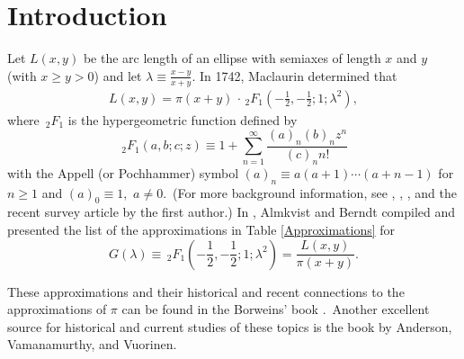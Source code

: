 \documentclass[final,oneeqnum]{siamltex}
\begin{document}
\section{Introduction}
\noindent Let $L(x,y)$ be the arc length of an ellipse with
\label{`semiaxes'} semiaxes of  length $x$ and $y$ (with $x \geq  y > 0$)
and let $\displaystyle  \lambda \equiv \frac{x-y}{x+y}.$
In 1742, Maclaurin  \cite{MC} determined that
\begin{eqnarray}  L(x,y) =
\pi
(x+y)\,\cdot\,_{2}F_{1}\left(-\frac{1}{2},-\frac{1}{2};1;\lambda^2\right),
\label{AX}
\end{eqnarray} where  ${\,}_{2}F_{1}$ is the   hypergeometric function
defined by
\[
 {\,}_{2}F_{1}\left(a,b;c;z\right)\equiv 1+\sum_{n=1}^{
\infty }\frac{(a)_{n} (b)_{n}z^{n}}{ (c)_{n}n!}
\]
 with the Appell (or Pochhammer) symbol $(a)_{n}\equiv
a(a+1)\cdots(a+n-1)$ for $n\geq 1$ and $(a)_{0}\equiv 1,$ $a\neq 0$.\  
(For more background  information,
 see \cite{AB}, \cite{R},  \cite{BPR}, and the recent
 survey
article  \cite{BARN} by the first author.)
 In \cite{AB}, Almkvist and Berndt
 compiled and presented  the
 list
 of  the approximations in Table \ref{Approximations} for
 \[
 G(\lambda) \equiv
\,_{2}F_{1}\left(-\frac{1}{2},-\frac{1}{2};1;\lambda^2\right)=\frac{L(x,y)}{
\pi(x+y)}.
\]

 \noindent These approximations and their historical and recent connections
to the
approximations of $\pi$ can be found in the Borweins' book \cite{BB}.\ Another
excellent source for historical and current studies of these
topics is the  book \cite{AVV} by Anderson, Vamanamurthy, and Vuorinen.
\end{document}
